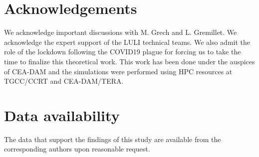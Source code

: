 \documentclass[
 reprint,
 amsmath,amssymb,
 aps,
]{revtex4-1}
\begin{document}
\section*{Acknowledgements}
We acknowledge important discussions with M. Grech and L. Gremillet. We acknowledge the expert support of the LULI technical teams. We also admit the role of the lockdown following the COVID19 plague for forcing us to take the time to finalize this theoretical work. This work has been done under the auspices of CEA-DAM  and the simulations were performed using HPC resources at TGCC/CCRT and CEA-DAM/TERA.

\section*{Data availability}
The data that support the findings of this study are available from the corresponding authors upon reasonable request.

\appendix
\end{document}
